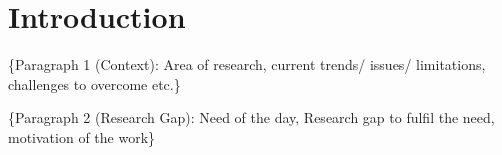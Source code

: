 \section{Introduction}
\label{sec:intro}
\{Paragraph 1 (Context): Area of research, current trends/ issues/ limitations, challenges to overcome etc.\}



\{Paragraph 2 (Research Gap): Need of the day, Research gap to fulfil the need, motivation of the work\}


